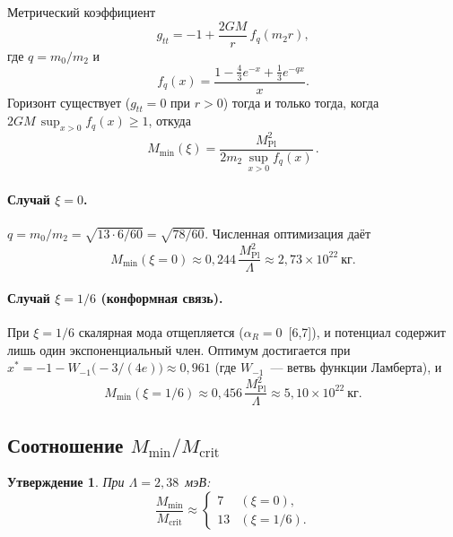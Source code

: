 \documentclass[12pt,a4paper]{article}
\newcommand{\Lam}{\Lambda}
\newcommand{\MPl}{M_{\mathrm{Pl}}}
\newcommand{\Mcrit}{M_{\mathrm{crit}}}
\theoremstyle{plain}
\newtheorem{proposition}[theorem]{Утверждение}
\theoremstyle{definition}
\begin{document}
Метрический коэффициент
\begin{equation}
  g_{tt} = -1 + \frac{2GM}{r}\,f_q(m_2 r),
\end{equation}
где $q = m_0/m_2$ и
\begin{equation}\label{eq:fq}
  f_q(x) = \frac{1 - \tfrac{4}{3}e^{-x} + \tfrac{1}{3}e^{-qx}}{x}.
\end{equation}
Горизонт существует ($g_{tt} = 0$ при $r > 0$) тогда и только
тогда, когда $2GM\,\sup_{x>0} f_q(x) \geq 1$, откуда
\begin{equation}\label{eq:Mmin}
  M_{\min}(\xi) = \frac{\MPl^2}{2m_2\,\sup_{x>0} f_q(x)}\,.
\end{equation}

\paragraph{Случай $\xi = 0$.}
$q = m_0/m_2 = \sqrt{13\cdot 6/60} = \sqrt{78/60}$. Численная
оптимизация даёт
\begin{equation}
  M_{\min}(\xi = 0) \approx 0{,}244\,\frac{\MPl^2}{\Lam}
  \approx 2{,}73 \times 10^{22}~\text{кг}.
\end{equation}

\paragraph{Случай $\xi = 1/6$ (конформная связь).}
При $\xi = 1/6$ скалярная мода отщепляется ($\alpha_R = 0$~[6,7]),
и потенциал содержит лишь один экспоненциальный член. Оптимум
достигается при
$x^* = -1 - W_{-1}\bigl(-3/(4e)\bigr) \approx 0{,}961$
(где $W_{-1}$~--- ветвь функции Ламберта), и
\begin{equation}
  M_{\min}(\xi = 1/6) \approx 0{,}456\,\frac{\MPl^2}{\Lam}
  \approx 5{,}10 \times 10^{22}~\text{кг}.
\end{equation}

\subsection{Соотношение $M_{\min}/\Mcrit$}

\begin{proposition}\label{prop:Mmin_Mcrit}
При $\Lam = 2{,}38$~мэВ:
\begin{equation}\label{eq:ratio}
  \frac{M_{\min}}{\Mcrit} \approx
  \begin{cases}
    7 & (\xi = 0),\\
    13 & (\xi = 1/6).
  \end{cases}
\end{equation}
\end{proposition}
\end{document}

